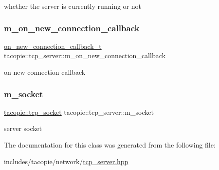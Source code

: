 whether the server is currently running or not \mbox{\label{classtacopie_1_1tcp__server_a779d20d286c32e5daff0012548afdfd0}} 
\subsubsection{\texorpdfstring{m\+\_\+on\+\_\+new\+\_\+connection\+\_\+callback}{m\_on\_new\_connection\_callback}}
{\footnotesize\ttfamily \hyperlink{classtacopie_1_1tcp__server_a103cb4e6fcab00f88a708aabd38b66ff}{on\+\_\+new\+\_\+connection\+\_\+callback\+\_\+t} tacopie\+::tcp\+\_\+server\+::m\+\_\+on\+\_\+new\+\_\+connection\+\_\+callback\hspace{0.3cm}{\ttfamily [private]}}

on new connection callback \mbox{\label{classtacopie_1_1tcp__server_a2838c1b655a8c4f5ccb1e157afc17284}} 
\subsubsection{\texorpdfstring{m\+\_\+socket}{m\_socket}}
{\footnotesize\ttfamily \hyperlink{classtacopie_1_1tcp__socket}{tacopie\+::tcp\+\_\+socket} tacopie\+::tcp\+\_\+server\+::m\+\_\+socket\hspace{0.3cm}{\ttfamily [private]}}

server socket 

The documentation for this class was generated from the following file\+:\begin{DoxyCompactItemize}
\item 
includes/tacopie/network/\hyperlink{tcp__server_8hpp}{tcp\+\_\+server.\+hpp}\end{DoxyCompactItemize}
